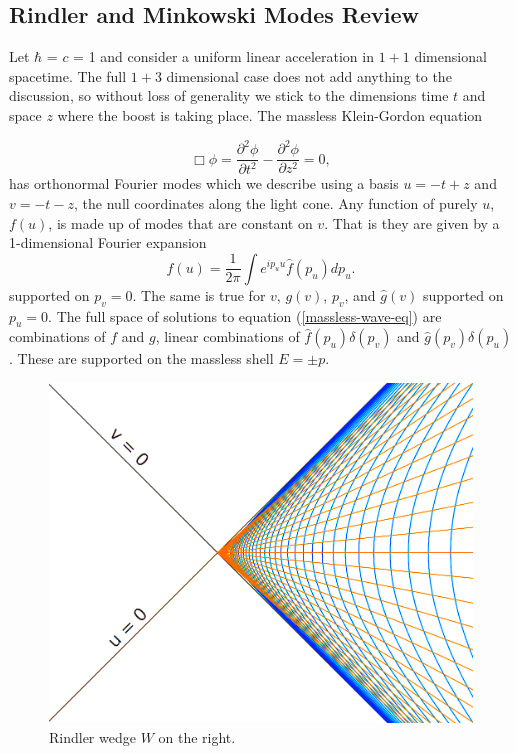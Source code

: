 \documentclass[12pt,a4paper]{article}
\begin{document}
\subsection{Rindler and Minkowski Modes Review}

Let $\hbar$ = $c$ = 1 and consider a uniform linear acceleration in $1+1$ dimensional spacetime. The full $1+3$ dimensional case does not add anything to the discussion, so without loss of generality we stick to the dimensions time $t$ and space $z$ where the boost is taking place.  The massless Klein-Gordon equation 

\begin{equation}
  \Box \phi = \frac{\partial^2 \phi}{\partial t^2} - \frac{\partial^2 \phi}{\partial z^2} = 0,
 \label{massless-wave-eq}
\end{equation}
has orthonormal Fourier modes which we describe using a basis  $u = -t + z$ and $v = -t - z$, the null coordinates along the light cone.  Any function of purely $u$, $f(u)$, is made up of modes that are constant on $v$.  That is they are given by a 1-dimensional Fourier expansion
\begin{equation}
  f(u) = \frac{1}{2\pi} \int{e^{i p_u u} \hat{f}(p_u) dp_u}.
\end{equation}
supported on $p_v = 0$.  The same is true for $v$, $g(v)$, $p_v$, and $\hat{g}(v)$ supported on $p_u = 0$.  The full space of solutions to equation (\ref{massless-wave-eq}) are combinations of $f$ and $g$, linear combinations of $\hat{f}(p_u) \delta(p_v)$ and $\hat{g}(p_v) \delta(p_u)$.  These are supported on the massless shell $E = \pm p$.


\begin{figure}[h]
\centering
\includegraphics[scale=0.4]{rindler_w.png}
\caption{Rindler wedge $W$ on the right.}
\label{rindlerw}
\end{figure}
\end{document}
